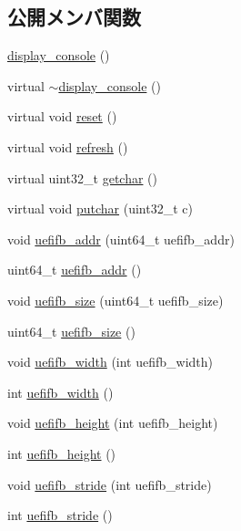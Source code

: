 \subsection*{公開メンバ関数}
\begin{DoxyCompactItemize}
\item 
\hyperlink{classdisplay__console_a6448ae90752aa1b07fd8ae741313ab7c}{display\+\_\+console} ()
\item 
virtual \hyperlink{classdisplay__console_a3e71de8ef36ebf5a251f27bfa86f90c6}{$\sim$display\+\_\+console} ()
\item 
virtual void \hyperlink{classdisplay__console_af24f8d041c5ffb3b19ecec5521daad4a}{reset} ()
\item 
virtual void \hyperlink{classdisplay__console_a94dcd0e51a5227c807c59c99c6a739c9}{refresh} ()
\item 
virtual uint32\+\_\+t \hyperlink{classdisplay__console_aca457aab1c95f8fe79b428f9e5b43a51}{getchar} ()
\item 
virtual void \hyperlink{classdisplay__console_a06e4aae84b14832a690bb915a33f54f0}{putchar} (uint32\+\_\+t c)
\item 
void \hyperlink{classdisplay__console_a0f34879169e6cc12e03071575c87dd83}{uefifb\+\_\+addr} (uint64\+\_\+t uefifb\+\_\+addr)
\item 
uint64\+\_\+t \hyperlink{classdisplay__console_a857a888bad7b9174a3b1310762718433}{uefifb\+\_\+addr} ()
\item 
void \hyperlink{classdisplay__console_afb29b425b4809708e4d1c89a2717847b}{uefifb\+\_\+size} (uint64\+\_\+t uefifb\+\_\+size)
\item 
uint64\+\_\+t \hyperlink{classdisplay__console_a1163663484e3dc414a3f0891137fc590}{uefifb\+\_\+size} ()
\item 
void \hyperlink{classdisplay__console_af3e64f62827bab683e73c8c2937bd061}{uefifb\+\_\+width} (int uefifb\+\_\+width)
\item 
int \hyperlink{classdisplay__console_a9842b9adc744d7be6cb4beebc357ded4}{uefifb\+\_\+width} ()
\item 
void \hyperlink{classdisplay__console_aabd6aa8ac978e0f9e3c6f6b3c9b9d806}{uefifb\+\_\+height} (int uefifb\+\_\+height)
\item 
int \hyperlink{classdisplay__console_afec1cad7f92d03a020a4a2140bcd3ee9}{uefifb\+\_\+height} ()
\item 
void \hyperlink{classdisplay__console_ab2c385da00eaa8481fc5f0ea1160783b}{uefifb\+\_\+stride} (int uefifb\+\_\+stride)
\item 
int \hyperlink{classdisplay__console_aacd72b116774e3d9cb02a364cda9b1b9}{uefifb\+\_\+stride} ()

\end{DoxyCompactItemize}
